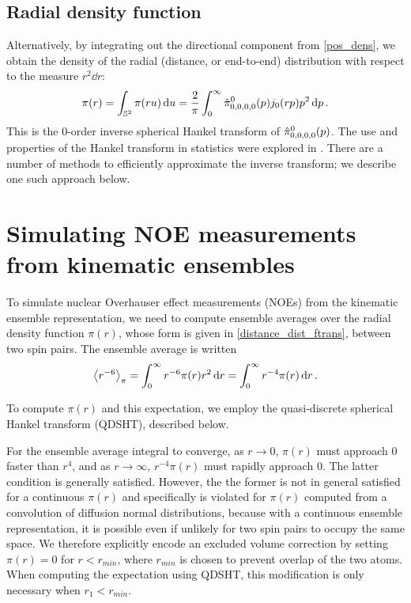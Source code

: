 \documentclass[../../main.tex]{subfiles}
\begin{document}
\begin{refsection}
	\subsection{Radial density function}

	Alternatively, by integrating out the directional component from \cref{pos_dens}, we obtain the density of the radial (\ie distance, or end-to-end) distribution with respect to the measure $r^2 \dd r$:
	\begin{equation}\label{distance_dist_ftrans}
		\pi(r) = \int_{\mathbb{S}^2} \pi(r u) \dd{u} = \frac{2}{\pi} \int_{0}^\infty \hat{\pi}^0_{0,0,0,0}(p) j_0(r p) p^2 \dd{p}.
	\end{equation}
	This is the 0-order inverse spherical Hankel transform of $\hat{\pi}^0_{0,0,0,0}(p)$.
	The use and properties of the Hankel transform in statistics were explored in \cite{lordUseHankelTransform1954}.
	There are a number of methods to efficiently approximate the inverse transform; we describe one such approach below.

	\section{Simulating NOE measurements from kinematic ensembles}\label{simulating-data-from-kinematic-ensembles}

	To simulate nuclear Overhauser effect measurements (NOEs) from the kinematic ensemble representation, we need to compute ensemble averages over the radial density function $\pi(r)$, whose form is given in \cref{distance_dist_ftrans}, between two spin pairs.
	The ensemble average is written
	\begin{equation}
		\left\langle r^{-6} \right\rangle_{\pi} = \int_{0}^\infty r^{-6} \pi(r) r^2 \dd{r} =  \int_{0}^\infty r^{-4} \pi(r) \dd{r}.
	\end{equation}

	To compute $\pi(r)$ and this expectation, we employ the quasi-discrete spherical Hankel transform (QDSHT), described below.

	For the ensemble average integral to converge, as $r \to 0$, $\pi(r)$ must approach 0 faster than $r^4$, and as $r \to \infty$, $r^{-4} \pi(r)$ must rapidly approach 0.
	The latter condition is generally satisfied.
	However, the the former is not in general satisfied for a continuous $\pi(r)$ and specifically is violated for $\pi(r)$ computed from a convolution of diffusion normal distributions, because with a continuous ensemble representation, it is possible even if unlikely for two spin pairs to occupy the same space.
	We therefore explicitly encode an excluded volume correction by setting $\pi(r) = 0$ for $r < r_{min}$, where $r_{min}$ is chosen to prevent overlap of the two atoms.
	When computing the expectation using QDSHT, this modification is only necessary when $r_1 < r_{min}$.


\end{refsection}
\end{document}
